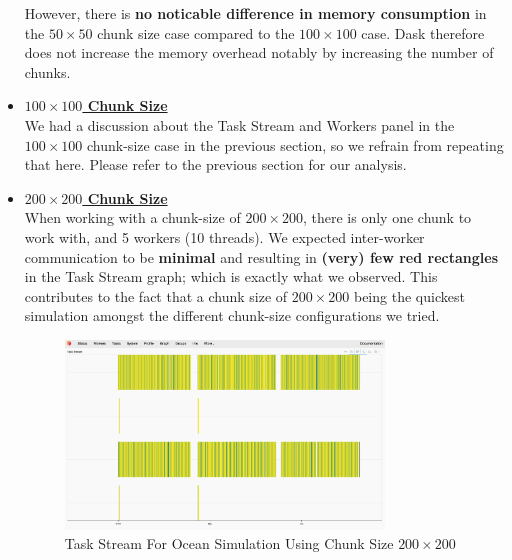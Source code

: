\documentclass[a4paper,12pt]{article}
\begin{document}
\begin{itemize}
However, there is \textbf{no noticable difference in memory consumption} in the $50 \times 50$ chunk size case compared to the $100 \times 100$ case.
Dask therefore does not increase the memory overhead notably by increasing the number of chunks.

\item \textbf{\underline{$100 \times 100$ Chunk Size}} \\
We had a discussion about the Task Stream and Workers panel in the $100 \times 100$ chunk-size case in the previous section, so we refrain from repeating that here. Please refer to the previous section for our analysis.

\item \textbf{\underline{$200 \times 200$ Chunk Size}} \\
  When working with a chunk-size of $200 \times 200$, there is only one chunk  to work with, and 5 workers (10 threads).
  We expected inter-worker communication to be \textbf{minimal} and resulting in \textbf{(very) few red rectangles} in the Task Stream graph; which is exactly what we observed.
  This contributes to the fact that a chunk size of $200 \times 200$ being the quickest simulation amongst the different chunk-size configurations we tried.

\begin{figure}[H]
  \centering
  \includegraphics[width=0.8\textwidth]{../images/task_stream_200chunk.png}
  \caption{Task Stream For Ocean Simulation Using Chunk Size $200 \times 200$}
\end{figure}


\end{itemize}
\end{document}
